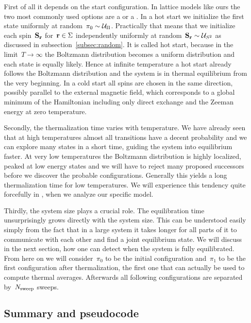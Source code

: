 First of all it depends on the start configuration. In lattice models like ours
the two most commonly used options are a  or a . In a hot start we initialize the first state uniformly at random~$\pi_0
\sim \mathcal{U}_{\Pi}$. Practically that means that we initialize each spin~$\mathbf{S}_{\mathbf{r}}$
for~$\mathbf{r} \in \Sigma$ independently uniformly at random~$\mathbf{S}_{\mathbf{r}} \sim \mathcal{U}_{S^2}$
as discussed in subsection~\ref{subsec:random}. It is called hot start, because
in the limit~$T\to \infty$ the Boltzmann distribution becomes a uniform
distribution and each state is equally likely. Hence at infinite temperature a
hot start already follows the Boltzmann distribution and the system is in
thermal equilibrium from the very beginning. In a cold start all spins are
chosen in the same direction, possibly parallel to the external magnetic field,
which corresponds to a global minimum of the Hamiltonian including only direct
exchange and the Zeeman energy at zero temperature.

Secondly, the thermalization time varies with temperature. We have already seen
that at high temperatures almost all transitions have a decent probability and
we can explore many states in a short time, guiding the system into equilibrium
faster. At very low temperatures the Boltzmann distribution is highly localized,
peaked at low energy states and we will have to reject many proposed successors
before we discover the probable configurations. Generally this yields a long
thermalization time for low temperatures. We will experience this tendency quite
forcefully in , when we analyze our specific model.

Thirdly, the system size plays a crucial role. The equilibration time
unsurprisingly grows directly with the system size. This can be understood
easily simply from the fact that in a large system it takes longer for all parts
of it to communicate with each other and find a joint equilibrium state. We will
discuss in the next section, how one can detect when the system is fully
equilibrated. From here on we will consider~$\pi_0$ to be the initial
configuration and~$\pi_1$ to be the first configuration after thermalization,
\ie{} the first one that can actually be used to compute thermal averages.
Afterwards all following configurations are separated by~$N_{\mathrm{sweep}}$ sweeps.

\subsection{Summary and pseudocode}

